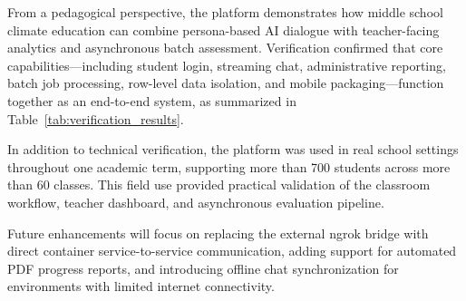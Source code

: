 \documentclass[12pt,a4paper,oneside]{report}
\begin{document}
    From a pedagogical perspective, the platform demonstrates how middle school climate education can combine persona-based AI dialogue with teacher-facing analytics and asynchronous batch assessment. Verification confirmed that core capabilities---including student login, streaming chat, administrative reporting, batch job processing, row-level data isolation, and mobile packaging---function together as an end-to-end system, as summarized in Table~\ref{tab:verification_results}.

    In addition to technical verification, the platform was used in real school settings throughout one academic term, supporting more than 700 students across more than 60 classes. This field use provided practical validation of the classroom workflow, teacher dashboard, and asynchronous evaluation pipeline.

    Future enhancements will focus on replacing the external ngrok bridge with direct container service-to-service communication, adding support for automated PDF progress reports, and introducing offline chat synchronization for environments with limited internet connectivity.
\end{document}
